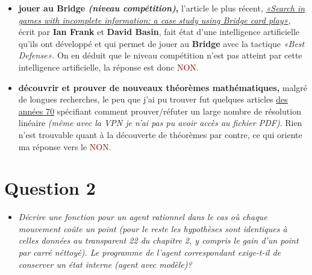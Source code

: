 \documentclass{article}
\newcommand{\gre}[1]{\textcolor{darkgreen}{#1}}
\newcommand{\rouge}[1]{\textcolor{darkred}{#1}}
\newcommand{\term}[1]{\textit{\textcolor{maintitle}{#1}}}
\begin{document}
\begin{sffamily}
\begin{itemize}
{too distant future.»} $\Rightarrow$ La réponse est donc \gre{OUI}.
\item \textbf{jouer au Bridge \textit{(niveau compétition)},}
l'article le plus récent, 
\href{http://www.sciencedirect.com/science?_ob=ArticleURL&_udi=B6TYF-3TP12X4-3&_user=532109&_coverDate=04/30/1998&_rdoc=1&_fmt=high&_orig=search&_origin=search&_sort=d&_docanchor=&view=c&_searchStrId=1508536596&_rerunOrigin=scholar.google&_acct=C000026718&_version=1&_urlVersion=0&_userid=532109&md5=1fc89a599671794b51c6346da562e219&searchtype=a}
{\textit{«Search in games with incomplete information: a case study using Bridge card play»}}, écrit par
\textbf{Ian Frank} et \textbf{David Basin}, fait état d'une intelligence artificielle qu'ils ont développé et qui permet de jouer 
au \textbf{Bridge} avec la tactique \textit{«Best Defense»}. On en déduit que le niveau compétition n'est pas atteint par cette
intelligence artificielle, la réponse est donc \rouge{NON}.
\item \textbf{découvrir et prouver de nouveaux théorèmes mathématiques,}
malgré de longues recherches, le peu que j'ai pu trouver fut quelques articles 
\href{http://www.sciencedirect.com/science?_ob=ArticleURL&_udi=B6TYF-47YJHBM-7&_user=532109&_coverDate=08/31/1979&_alid=1508526304&_rdoc=1&_fmt=high&_orig=search&_origin=search&_zone=rslt_list_item&_cdi=5617&_sort=r&_st=13&_docanchor=&view=c&_ct=109&_acct=C000026718&_version=1&_urlVersion=0&_userid=532109&md5=90dc57b7279c2f524a73f59c197bb90d&searchtype=a}
{des années 70} spécifiant comment prouver/réfuter un large nombre de résolution linéaire \textit{(même avec la VPN je n'ai pas pu 
avoir accès au fichier PDF)}. Rien n'est trouvable quant à la découverte de théorèmes par contre, ce qui oriente ma réponse vers 
le \rouge{NON}.
\end{itemize}

\section{Question 2}

\newcommand{\valeur}[1]{\gre{\textit{#1}}}

\begin{itemize}
\item \term{Décrire une fonction pour un agent rationnel dans le cas où chaque mouvement coûte un point (pour le 
reste les hypothèses sont identiques à celles données au transparent 22 du chapitre 2, y compris le gain d'un point
par carré néttoyé). Le programme de l'agent correspondant exige-t-il de conserver un état interne (agent avec 
modèle)?}\\



\end{itemize}
\end{sffamily}
\end{document}
